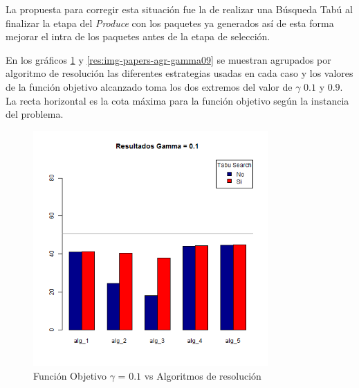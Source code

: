 La propuesta para corregir esta situación fue la de realizar una Búsqueda Tabú al finalizar la etapa del \textit{Produce} con los paquetes ya generados así de esta forma mejorar el intra de los paquetes antes de la etapa de selección.

\newpage

En los gráficos \ref{res:img-papers-agr-gamma01} y \ref{res:img-papers-agr-gamma09} se muestran agrupados por algoritmo de resolución las diferentes estrategias usadas en cada caso y los valores de la función objetivo alcanzado toma los dos extremos del valor de $\gamma$ $0.1$ y $0.9$. La recta horizontal es la cota máxima para la función objetivo según la instancia del problema.

\begin{figure}[H]
  \centering
    \includegraphics[width=0.8\textwidth]{resultados/papers/Graficos_agrupados/gamma01.png}
  \caption{Función Objetivo $\gamma$ = $0.1$ vs Algoritmos de resolución}
  \label{res:img-papers-agr-gamma01}
\end{figure}

